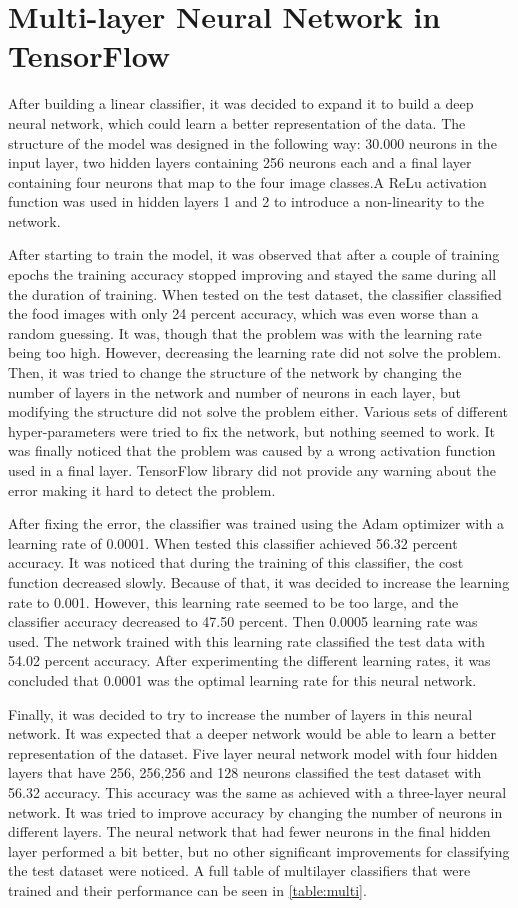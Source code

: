 \section{Multi-layer Neural Network in TensorFlow}

After building a linear classifier, it was decided to expand it to build a deep neural network, which could learn a better representation of the data. The structure of the model was designed in the following way: 30.000 neurons in the input layer, two hidden layers containing 256 neurons each and a final layer containing four neurons that map to the four image classes.A ReLu activation function was used in hidden layers 1 and 2  to introduce a non-linearity to the network. 


After starting to train the model, it was observed that after a couple of training epochs the training accuracy stopped improving and stayed the same during all the duration of training. When tested on the test dataset, the classifier classified the food images with only 24 percent accuracy, which was even worse than a random guessing. It was, though that the problem was with the learning rate being too high. However, decreasing the learning rate did not solve the problem. Then, it was tried to change the structure of the network by changing the number of layers in the network and number of neurons in each layer, but modifying the structure did not solve the problem either. Various sets of different hyper-parameters were tried to fix the network, but nothing seemed to work. It was finally noticed that the problem was caused by a wrong activation function used in a final layer. TensorFlow library did not provide any warning about the error making it hard to detect the problem. 

After fixing the error, the classifier was trained using the Adam optimizer with a learning rate of 0.0001. When tested this classifier achieved 56.32 percent accuracy. It was noticed that during the training of this classifier, the cost function decreased slowly. Because of that, it was decided to increase the learning rate to 0.001. However, this learning rate seemed to be too large, and the classifier accuracy decreased to 47.50 percent. Then 0.0005 learning rate was used. The network trained with this learning rate classified the test data with 54.02 percent accuracy. After experimenting the different learning rates, it was concluded that  0.0001 was the optimal learning rate for this neural network.

Finally, it was decided to try to increase the number of layers in this neural network. It was expected that a deeper network would be able to learn a better representation of the dataset. Five layer neural network model with four hidden layers that have 256, 256,256 and 128 neurons classified the test dataset with 56.32 accuracy. This accuracy was the same as achieved with a three-layer neural network. It was tried to improve accuracy by changing the number of neurons in different layers. The neural network that had fewer neurons in the final hidden layer performed a bit better, but no other significant improvements for classifying the test dataset were noticed. A full table of multilayer classifiers that were trained and their performance can be seen in \autoref{table:multi}.

